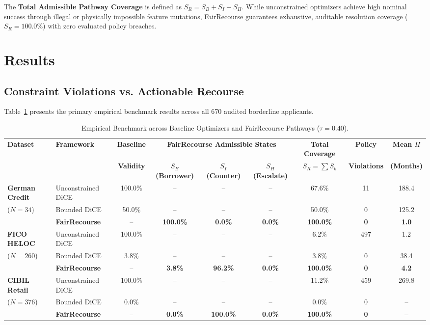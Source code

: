 \documentclass[manuscript,screen,review,anonymous]{acmart}
\begin{document}
\noindent The \textbf{Total Admissible Pathway Coverage} is defined as $S_R = S_B + S_I + S_H$. While unconstrained optimizers achieve high nominal success through illegal or physically impossible feature mutations, FairRecourse guarantees exhaustive, auditable resolution coverage ($S_R = 100.0\%$) with zero evaluated policy breaches.

\section{Results}

\subsection{Constraint Violations vs. Actionable Recourse}
Table~\ref{tab:primary_benchmark} presents the primary empirical benchmark results across all 670 audited borderline applicants.

\begin{table}[t]
\centering
\small
\caption{Empirical Benchmark across Baseline Optimizers and FairRecourse Pathways ($\tau = 0.40$).}
\label{tab:primary_benchmark}
\begin{tabular}{ll c ccc c cc}
\toprule
\textbf{Dataset} & \textbf{Framework} & \textbf{Baseline} & \multicolumn{3}{c}{\textbf{FairRecourse Admissible States}} & \textbf{Total Coverage} & \textbf{Policy} & \textbf{Mean $H$} \\
\cmidrule(lr){4-6}
 & & \textbf{Validity} & \textbf{$S_B$ (Borrower)} & \textbf{$S_I$ (Counter)} & \textbf{$S_H$ (Escalate)} & \textbf{$S_R = \sum S_k$} & \textbf{Violations} & \textbf{(Months)} \\
\midrule
\textbf{German Credit} & Unconstrained DiCE & 100.0\% & -- & -- & -- & 67.6\% & 11 & 188.4 \\
($N=34$)               & Bounded DiCE       & 50.0\%  & -- & -- & -- & 50.0\% & 0  & 125.2 \\
                       & \textbf{FairRecourse} & --   & \textbf{100.0\%} & \textbf{0.0\%} & \textbf{0.0\%} & \textbf{100.0\%} & \textbf{0} & \textbf{1.0} \\
\midrule
\textbf{FICO HELOC}    & Unconstrained DiCE & 100.0\% & -- & -- & -- & 6.2\%  & 497 & 1.2 \\
($N=260$)              & Bounded DiCE       & 3.8\%   & -- & -- & -- & 3.8\%  & 0   & 38.4 \\
                       & \textbf{FairRecourse} & --   & \textbf{3.8\%} & \textbf{96.2\%} & \textbf{0.0\%} & \textbf{100.0\%} & \textbf{0} & \textbf{4.2} \\
\midrule
\textbf{CIBIL Retail}  & Unconstrained DiCE & 100.0\% & -- & -- & -- & 11.2\% & 459 & 269.8 \\
($N=376$)              & Bounded DiCE       & 0.0\%   & -- & -- & -- & 0.0\%  & 0   & -- \\
                       & \textbf{FairRecourse} & --   & \textbf{0.0\%} & \textbf{100.0\%} & \textbf{0.0\%} & \textbf{100.0\%} & \textbf{0} & \textbf{--} \\
\bottomrule
\end{tabular}
\end{table}
\end{document}
